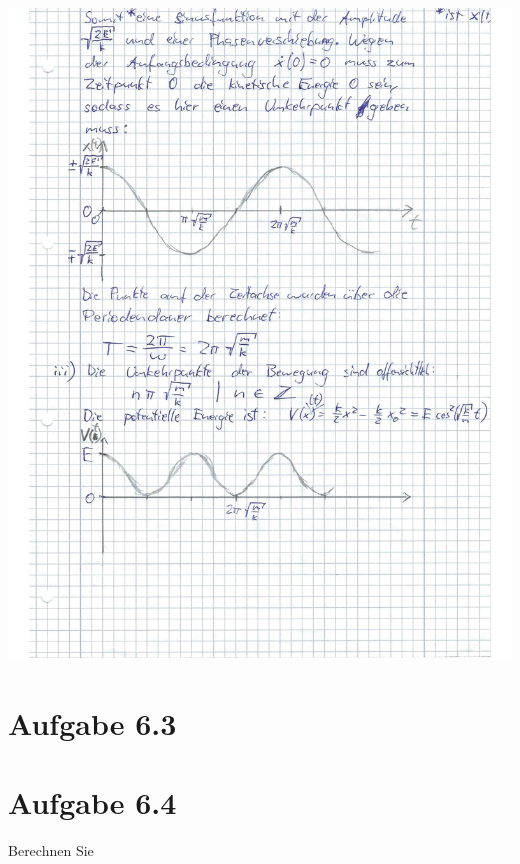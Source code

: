 \documentclass{theozettel}
\begin{document}
\begin{center}
\includegraphics[width=15cm]{A2-Teil3.pdf}
\end{center}


\section*{Aufgabe 6.3} 





\section*{Aufgabe 6.4} 
Berechnen Sie
\end{document}
